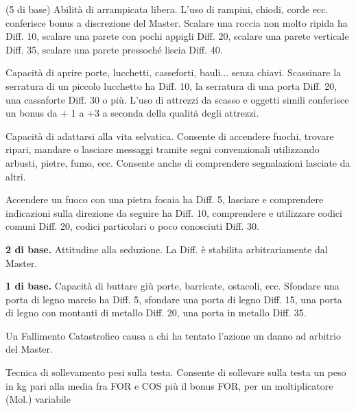 
 (5 di base) Abilit\`a di
arrampicata libera. L'uso di rampini, chiodi, corde ecc. conferisce
bonus a discrezione del Master.  Scalare una roccia non molto ripida
ha Diff.  10, scalare una parete con pochi appigli Diff. 20, scalare una
parete verticale Diff. 35, scalare una parete pressoch\'e liscia
Diff. 40.

 Capacit\`a di aprire porte,
lucchetti, casseforti, bauli... senza chiavi. Scassinare la serratura
di un piccolo lucchetto ha Diff.  10, la serratura di una porta Diff.
20, una cassaforte Diff. 30 o pi\`u.  L'uso di attrezzi da scasso e
oggetti simili conferisce un bonus da + 1 a +3 a seconda della
qualit\`a degli attrezzi.

\iffullversion 
{} Capacit\`a di adattarsi alla
vita selvatica. Consente di accendere fuochi, trovare ripari,
mandare o lasciare messaggi tramite segni convenzionali utilizzando
arbusti, pietre, fumo, ecc.  Consente anche di comprendere
segnalazioni lasciate da altri.

Accendere un fuoco con una pietra focaia ha Diff. 5, lasciare e
comprendere indicazioni sulla direzione da seguire ha Diff.  10,
comprendere e utilizzare codici comuni Diff. 20, codici particolari o
poco conosciuti Diff.  30.

 \textbf{2 di base.} Attitudine alla seduzione. La Diff.
\`e stabilita arbitrariamente dal Master.

 \textbf{1 di base.} Capacit\`a di buttare gi\`u
porte, barricate, ostacoli, ecc.  Sfondare una porta di legno marcio
ha Diff. 5, sfondare una porta di legno Diff. 15, una porta di legno
con montanti di metallo Diff. 20, una porta in metallo Diff. 35.

Un Fallimento Catastrofico causa a chi ha tentato l'azione un danno ad
arbitrio del Master.
\fi

 Tecnica di sollevamento pesi sulla testa.
Consente di sollevare sulla testa un peso in kg pari alla media fra
FOR e COS pi\`u il bonus FOR, per un moltiplicatore (Mol.)
variabile

